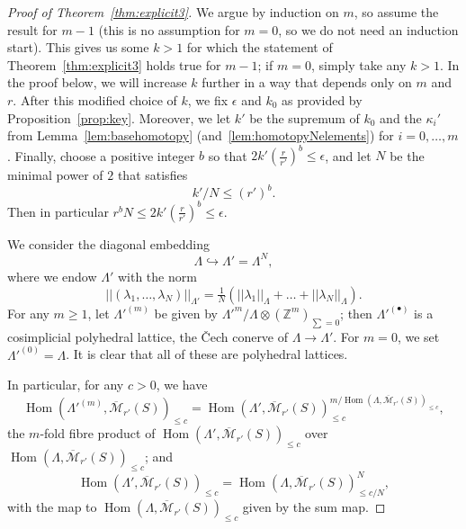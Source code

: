 \documentclass[11pt]{amsbook}
\DeclareMathOperator{\Hom}{Hom}
\numberwithin{equation}{section}
\numberwithin{theorem}{section}
\theoremstyle{definition}
\begin{document}
\begin{proof}[Proof of Theorem~\ref{thm:explicit3}] We argue by induction on $m$, so assume the result for $m-1$ (this is no assumption for $m=0$, so we do not need an induction start). This gives us some $k>1$ for which the statement of Theorem~\ref{thm:explicit3} holds true for $m-1$; if $m=0$, simply take any $k>1$. In the proof below, we will increase $k$ further in a way that depends only on $m$ and $r$. After this modified choice of $k$, we fix $\epsilon$ and $k_0$ as provided by Proposition~\ref{prop:key}. Moreover, we let $k'$ be the supremum of $k_0$ and the $\kappa_i'$ from Lemma~\ref{lem:basehomotopy} (and~\ref{lem:homotopyNelements}) for $i=0,\ldots,m$. Finally, choose a positive integer $b$ so that $2k'(\tfrac r{r'})^b\leq \epsilon$, and let $N$ be the minimal power of $2$ that satisfies
\[
k'/N\leq (r')^b.
\]
Then in particular $r^bN\leq 2k'(\tfrac{r}{r'})^b\leq \epsilon$.

We consider the diagonal embedding
\[
\Lambda\hookrightarrow \Lambda' = \Lambda^N,
\]
where we endow $\Lambda'$ with the norm
\[
||(\lambda_1,\ldots,\lambda_N)||_{\Lambda'} = \tfrac 1N(||\lambda_1||_\Lambda+\ldots+||\lambda_N||_\Lambda).
\]
For any $m\geq 1$, let $\Lambda'^{(m)}$ be given by $\Lambda'^m / \Lambda\otimes (\mathbb Z^m)_{\sum=0}$; then $\Lambda'^{(\bullet)}$ is a cosimplicial polyhedral lattice, the \v{C}ech conerve of $\Lambda\to \Lambda'$. For $m=0$, we set $\Lambda'^{(0)} = \Lambda$. It is clear that all of these are polyhedral lattices.

In particular, for any $c>0$, we have
\[
\Hom(\Lambda'^{(m)},\overline{\mathcal M}_{r'}(S))_{\leq c} = \Hom(\Lambda',\overline{\mathcal M}_{r'}(S))_{\leq c}^{m/\Hom(\Lambda,\overline{\mathcal M}_{r'}(S))_{\leq c}},
\]
the $m$-fold fibre product of $\Hom(\Lambda',\overline{\mathcal M}_{r'}(S))_{\leq c}$ over $\Hom(\Lambda,\overline{\mathcal M}_{r'}(S))_{\leq c}$; and
\[
\Hom(\Lambda',\overline{\mathcal M}_{r'}(S))_{\leq c} = \Hom(\Lambda,\overline{\mathcal M}_{r'}(S))_{\leq c/N}^N,
\]
with the map to $\Hom(\Lambda,\overline{\mathcal M}_{r'}(S))_{\leq c}$ given by the sum map.


\end{proof}
\end{document}
